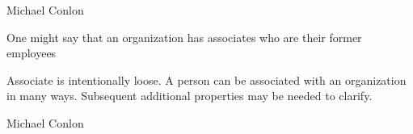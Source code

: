\documentclass[letterpaper,10pt,english]{sphinxmanual}
\begin{document}
\begin{sphinxShadowBox}

\sphinxAtStartPar
Michael Conlon 
\end{sphinxShadowBox}

\begin{sphinxShadowBox}

\sphinxAtStartPar
{\hyperref[\detokenize{doc-ORG_0000001::doc}]{}}
\end{sphinxShadowBox}

\begin{sphinxShadowBox}

\sphinxAtStartPar
{\hyperref[\detokenize{doc-NCBITaxon_9606::doc}]{}}
\end{sphinxShadowBox}

\begin{sphinxShadowBox}

\sphinxAtStartPar
{\hyperref[\detokenize{doc-ORG_2000019::doc}]{}}
\end{sphinxShadowBox}

\begin{sphinxShadowBox}

\sphinxAtStartPar
One might say that an organization has associates who are their former employees
\end{sphinxShadowBox}

\begin{sphinxShadowBox}

\sphinxAtStartPar
Associate is intentionally loose.  A person can be associated with an organization in many ways.  Subsequent additional properties may be needed to clarify.
\end{sphinxShadowBox}

\begin{sphinxShadowBox}

\sphinxAtStartPar
Michael Conlon 
\end{sphinxShadowBox}
\begin{quote}

\ignorespaces \end{quote}
\end{document}
